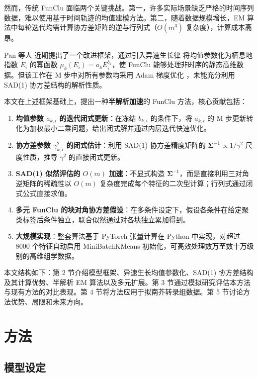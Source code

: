 \documentclass[12pt,a4paper]{article}
\begin{document}
然而，传统 FunClu 面临两个关键挑战。第一，许多实际场景缺乏严格的时间序列数据，难以使用基于时间轨迹的均值建模方法。第二，随着数据规模增长，EM 算法中每轮迭代均需计算协方差矩阵的逆与行列式（$O(m^3)$ 复杂度），计算成本高昂。

Pan 等人 \cite{pan2026improved} 近期提出了一个改进框架，通过引入异速生长律 \cite{west1997general,huxley1936terminology} 将均值参数化为栖息地指数 $E_i$ 的幂函数 $\mu_k(E_i) = a_k E_i^{b_k}$，使 FunClu 能够处理非时序的静态高维数据。但该工作在 M 步中对所有参数均采用 Adam 梯度优化 \cite{kingma2014adam}，未能充分利用 SAD(1) 协方差结构的解析性质。

本文在上述框架基础上，提出一种\textbf{半解析加速}的 FunClu 方法，核心贡献包括：

\begin{enumerate}[leftmargin=*]
    \item \textbf{均值参数 $a_{k,i}$ 的迭代闭式更新}：在冻结 $b_{k,i}$ 的条件下，将 $a_{k,i}$ 的 M 步更新转化为加权最小二乘问题，给出闭式解并通过内层迭代快速优化。
    \item \textbf{协方差参数 $\gamma_{k,i}^2$ 的闭式估计}：利用 SAD(1) 协方差精度矩阵的 $\bm{\Sigma}^{-1} \propto 1/\gamma^2$ 尺度性质，推导 $\gamma^2$ 的直接闭式更新。
    \item \textbf{SAD(1) 似然评估的 $O(m)$ 加速}：不显式构造 $\bm{\Sigma}^{-1}$，而是直接利用三对角逆矩阵的稀疏性以 $O(m)$ 复杂度完成每个特征的二次型计算；行列式通过闭式公式直接求值。
    \item \textbf{多元 FunClu 的块对角协方差假设}：在多条件设定下，假设各条件在给定聚类标签后条件独立，联合似然通过对各块独立累加得到。
    \item \textbf{大规模实现}：整套算法基于 PyTorch 张量计算在 Python 中实现，对超过 8000 个特征自动启用 MiniBatchKMeans \cite{sculley2010web} 初始化，可高效处理数万至数十万级别的高维组学数据。
\end{enumerate}

本文结构如下：第 2 节介绍模型框架、异速生长均值参数化、SAD(1) 协方差结构及其计算优势、半解析 EM 算法以及多元扩展。第 3 节通过模拟研究评估本方法与现有方法的对比表现。第 4 节将方法应用于拟南芥转录组数据。第 5 节讨论方法优势、局限和未来方向。

\section{方法}

\subsection{模型设定}
\end{document}
